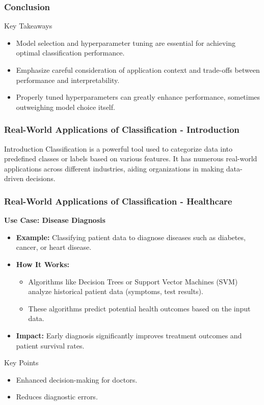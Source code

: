 \documentclass[aspectratio=169]{beamer}
\begin{document}
\begin{frame}[fragile]
    \frametitle{Conclusion}
    \begin{block}{Key Takeaways}
        \begin{itemize}
            \item Model selection and hyperparameter tuning are essential for achieving optimal classification performance.
            \item Emphasize careful consideration of application context and trade-offs between performance and interpretability.
            \item Properly tuned hyperparameters can greatly enhance performance, sometimes outweighing model choice itself.
        \end{itemize}
    \end{block}
\end{frame}

\begin{frame}[fragile]
    \frametitle{Real-World Applications of Classification - Introduction}
    \begin{block}{Introduction}
        Classification is a powerful tool used to categorize data into predefined classes or labels based on various features. It has numerous real-world applications across different industries, aiding organizations in making data-driven decisions.
    \end{block}
\end{frame}

\begin{frame}[fragile]
    \frametitle{Real-World Applications of Classification - Healthcare}
    \textbf{Use Case: Disease Diagnosis}
    \begin{itemize}
        \item \textbf{Example:} Classifying patient data to diagnose diseases such as diabetes, cancer, or heart disease.
        \item \textbf{How It Works:} 
        \begin{itemize}
            \item Algorithms like Decision Trees or Support Vector Machines (SVM) analyze historical patient data (symptoms, test results).
            \item These algorithms predict potential health outcomes based on the input data.
        \end{itemize}
        \item \textbf{Impact:} Early diagnosis significantly improves treatment outcomes and patient survival rates.
    \end{itemize}
    \begin{block}{Key Points}
        \begin{itemize}
            \item Enhanced decision-making for doctors.
            \item Reduces diagnostic errors.
        \end{itemize}
    \end{block}
\end{frame}
\end{document}

